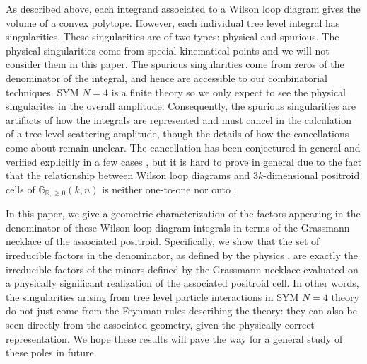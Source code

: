 \documentclass[11pt]{article}
\newcommand{\sanote}{\todo[color=violet!30]}
\newcommand{\R}{\mathbb{R}}
\newcommand{\Gr}{\mathbb{G}_{\R, \geq 0}}
\theoremstyle{remark}
\theoremstyle{definition}
\begin{document}
As described above, each integrand associated to a Wilson loop diagram gives the volume of a convex polytope. However, each individual tree level integral has singularities. These singularities are of two types: physical and spurious.  The physical singularities come from special kinematical points and we will not consider them in this paper.  The spurious singularities come from zeros of the denominator of the integral, and hence are accessible to our combinatorial techniques.  SYM $N=4$ is a finite theory so we only expect to see the physical singularites in the overall amplitude.  Consequently, the spurious singularities are artifacts of how the integrals are represented and must cancel in the calculation of a tree level scattering amplitude, though the details of how the cancellations come about remain unclear. The cancellation has been conjectured in general \cite{Hodges2013} and verified explicitly in a few cases \cite{casestudy, HeslopStewart}, but it is hard to prove in general due to the fact that the relationship between Wilson loop diagrams and $3k$-dimensional positroid cells of $\Gr(k,n)$ is neither one-to-one nor onto \cite{generalcombinatoricsI}.


In this paper, we give a geometric characterization of the factors appearing in the denominator of these Wilson loop diagram integrals in terms of the Grassmann necklace of the associated positroid. Specifically, we show that the set of irreducible factors in the denominator, as defined by the physics \cite{HeslopStewart}, are exactly the irreducible factors of the minors defined by the Grassmann necklace evaluated on a physically significant realization of the associated positroid cell. In other words, the singularities arising from tree level particle interactions in SYM $N=4$ theory do not just come from the Feynman rules describing the theory: they can also be seen directly from the associated geometry, given the physically correct representation.  We hope these results will pave the way for a general study of these poles in future. 
\end{document}
